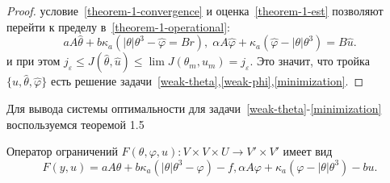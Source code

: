 \documentclass[10pt]{article}
\begin{document}
\begin{proof}
        условие~\eqref{theorem-1-convergence} и оценка~\eqref{theorem-1-est} позволяют перейти
        к пределу в~\eqref{theorem-1-operational}:
        \[
            a A \hat{\theta} + b \kappa_a (|\theta|\theta^3 - \hat{\varphi} = Br), \;
            \alpha A \hat{\varphi} + \kappa_a (\hat{\varphi} -|\theta|\theta^3) = B \hat{u}.
        \]
        и при этом $j_\varepsilon \leq J(\hat{\theta}, \hat{u}) \leq \lim J(\theta_m, u_m) =
        j_\varepsilon$.
        Это значит, что тройка $\{ \hat{u}, \hat{\theta}, \hat{\varphi} \}$ есть
        решение задачи~\eqref{weak-theta},\eqref{weak-phi},\eqref{minimization}.
    \end{proof}

    Для вывода системы оптимальности для задачи~\eqref{weak-theta}-\eqref{minimization}
    воспользуемся теоремой 1.5~\cite{???}

    Оператор ограничений $F(\theta, \varphi, u) : V \times V \times U \rightarrow V' \times V'$ имеет вид
    \[
        F(y, u) = { aA\theta + b \kappa_a (|\theta|\theta^3 - \varphi) - f,
        \alpha A \varphi + \kappa_a (\varphi -|\theta| \theta^3) - bu}.
    \]
\end{document}
